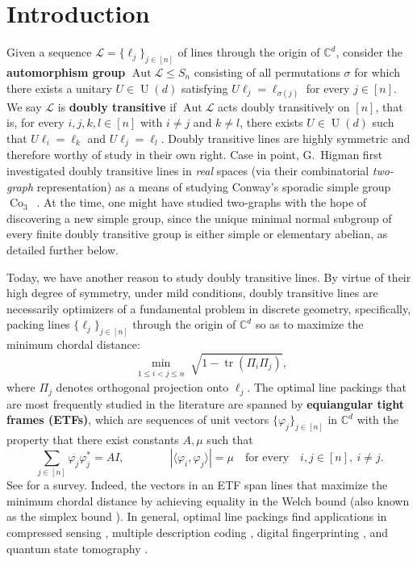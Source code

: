 \section{Introduction}


Given a sequence $\mathscr{L} = \{\ell_j\}_{j\in [n]}$ of lines through the origin of $\mathbb{C}^d$, consider the \textbf{automorphism group} $\operatorname{Aut}\mathscr{L} \leq S_n$ consisting of all permutations $\sigma$ for which there exists a unitary $U \in \operatorname{U}(d)$ satisfying $U \ell_j = \ell_{\sigma(j)}$ for every $j \in [n]$.
We say $\mathscr{L}$ is \textbf{doubly transitive} if $\operatorname{Aut} \mathscr{L}$ acts doubly transitively on $[n]$, that is, for every $i,j,k,l\in[n]$ with $i\neq j$ and $k\neq l$, there exists $U\in\operatorname{U}(d)$ such that $U\ell_i=\ell_k$ and $U\ell_j=\ell_l$.
Doubly transitive lines are highly symmetric and therefore worthy of study in their own right.
Case in point, G.~Higman first investigated doubly transitive lines in \textit{real} spaces (via their combinatorial \textit{two-graph} representation) as a means of studying Conway's sporadic simple group $\operatorname{Co}_3$~\cite{Taylor:77}.
At the time, one might have studied two-graphs with the hope of discovering a new simple group, since the unique minimal normal subgroup of every finite doubly transitive group is either simple or elementary abelian, as detailed further below.

Today, we have another reason to study doubly transitive lines.
By virtue of their high degree of symmetry, under mild conditions, doubly transitive lines are necessarily optimizers of a fundamental problem in discrete geometry, specifically, packing lines $\{\ell_j\}_{j\in[n]}$ through the origin of $\mathbb{C}^d$ so as to maximize the minimum chordal distance:
\[
\min_{\substack{1\leq i<j\leq n}}\sqrt{1-\operatorname{tr}(\Pi_i\Pi_j)},
\]
where $\Pi_j$ denotes orthogonal projection onto $\ell_j$.
The optimal line packings that are most frequently studied in the literature are spanned by \textbf{equiangular tight frames (ETFs)}, which are sequences of unit vectors $\{\varphi_j\}_{j\in[n]}$ in $\mathbb{C}^d$ with the property that there exist constants $A,\mu$ such that
\[
\sum_{j\in[n]}\varphi_j\varphi_j^*= A I,
\qquad
\qquad
|\langle \varphi_i,\varphi_j\rangle|= \mu
\quad
\text{for every}
\quad
i,j\in[n],~i\neq j.
\]
See \cite{FickusMixon:table} for a survey.
Indeed, the vectors in an ETF span lines that maximize the minimum chordal distance by achieving equality in the Welch bound \cite{Welch:74} (also known as the simplex bound \cite{ConwayHardinSloane:96}). 
In general, optimal line packings find applications in compressed sensing \cite{BandeiraFickusMixonWong:13}, multiple description coding \cite{StrohmerHeath:03}, digital fingerprinting \cite{MixonQuinnKiyavashFickus:13}, and quantum state tomography \cite{RenesBlumeKohoutScottCaves:04}.

